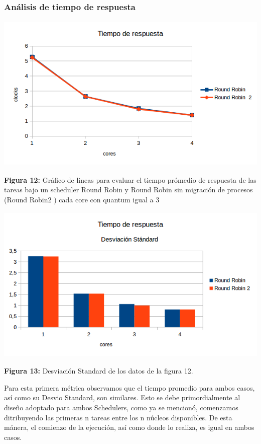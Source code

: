 \documentclass[a4paper]{article}
\begin{document}
\subsubsection*{An\'alisis de tiempo de respuesta}
\includegraphics[width=\textwidth,height=3.0in,keepaspectratio
]{imagenes/ej8/tr.png} \\
\begin {flushleft}
\textbf{Figura 12:} Gráfico de lineas para evaluar el tiempo prómedio de respuesta de las tareas bajo un scheduler Round Robin y Round Robin sin migración de procesos (Round Robin2 ) cada core con quantum igual a 3
\end{flushleft}	



\includegraphics[width=\textwidth,height=3.0in,keepaspectratio
]{imagenes/ej8/trds.png} \\
\begin {flushleft}
\textbf{Figura 13:} Desviación Standard de los datos de la figura 12.
\end{flushleft}	

Para esta primera métrica observamos que el tiempo promedio para ambos casos, así como su Desvio Standard, son similares. Esto se debe primordialmente al diseño adoptado para ambos Schedulers, como ya se mencionó, comenzamos ditribuyendo las primeras n tareas entre los n núcleos disponibles. De esta mánera, el comienzo de la ejecución, así como donde lo realiza, es igual en ambos casos.   
\end{document}
